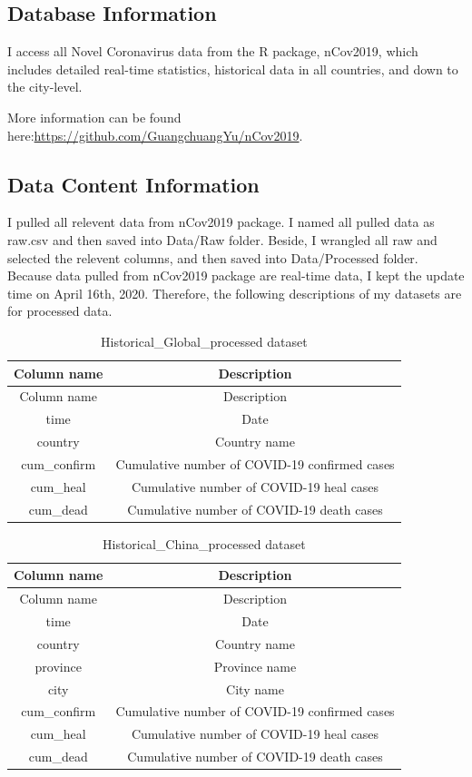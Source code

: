 \documentclass[12pt,]{article}
\begin{document}
\hypertarget{database-information}{%
\subsection{Database Information}\label{database-information}}

I access all Novel Coronavirus data from the R package, nCov2019, which
includes detailed real-time statistics, historical data in all
countries, and down to the city-level.

More information can be found
here:\url{https://github.com/GuangchuangYu/nCov2019}.

\hypertarget{data-content-information}{%
\subsection{Data Content Information}\label{data-content-information}}

I pulled all relevent data from nCov2019 package. I named all pulled
data as raw.csv and then saved into Data/Raw folder. Beside, I wrangled
all raw and selected the relevent columns, and then saved into
Data/Processed folder. Because data pulled from nCov2019 package are
real-time data, I kept the update time on April 16th, 2020. Therefore,
the following descriptions of my datasets are for processed data.

\begin{longtable}[]{@{}cc@{}}
\caption{Historical\_Global\_processed dataset}\tabularnewline
\toprule
Column name & Description\tabularnewline
\midrule
\endfirsthead
\toprule
Column name & Description\tabularnewline
\midrule
\endhead
time & Date\tabularnewline
country & Country name\tabularnewline
cum\_confirm & Cumulative number of COVID-19 confirmed
cases\tabularnewline
cum\_heal & Cumulative number of COVID-19 heal cases\tabularnewline
cum\_dead & Cumulative number of COVID-19 death cases\tabularnewline
\bottomrule
\end{longtable}

\begin{longtable}[]{@{}cc@{}}
\caption{Historical\_China\_processed dataset}\tabularnewline
\toprule
Column name & Description\tabularnewline
\midrule
\endfirsthead
\toprule
Column name & Description\tabularnewline
\midrule
\endhead
time & Date\tabularnewline
country & Country name\tabularnewline
province & Province name\tabularnewline
city & City name\tabularnewline
cum\_confirm & Cumulative number of COVID-19 confirmed
cases\tabularnewline
cum\_heal & Cumulative number of COVID-19 heal cases\tabularnewline
cum\_dead & Cumulative number of COVID-19 death cases\tabularnewline
\bottomrule
\end{longtable}
\end{document}
